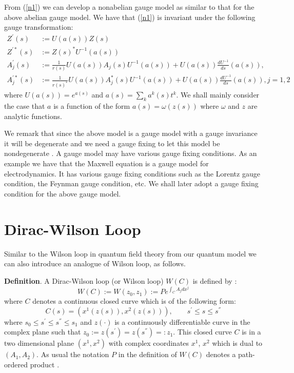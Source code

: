 \documentclass[a4paper,a4paper]{article}
\begin{document}
From (\ref{n1}) we can develop a nonabelian gauge model as similar
to that for the above abelian gauge model.
We have that (\ref{n1}) is invariant under the following
gauge transformation:
\begin{equation}
\begin{array}{rl}
Z^{\prime}(s) & :=U(a(s))Z(s) \\
Z^{\prime *}(s) & :=Z(s)^{*}U^{-1}(a(s)) \\
A_j^{\prime}(s) &
:=
\frac{1}{r(s)}U(a(s))A_j(s)U^{-1}(a(s))+
 U(a(s))\frac{dU^{-1}}{ds}(a(s)),\\
A_j^{\prime *}(s) &
:=
\frac{1}{r(s)^{*}}U(a(s))A_j^{*}(s)U^{-1}(a(s))+
 U(a(s))\frac{dU^{-1}}{ds}(a(s)),
j =1,2
\end{array}
\label{n2}
\end{equation}
where $U(a(s))=e^{a(s)}$ and $a(s)=\sum_k a^k (s)t^k$.
We shall mainly consider the case that $a$ is a function
of the form $a(s)=\omega(z(s))$ where $\omega$ 
and $z$ are analytic functions.

We remark that since the above model is a gauge model with
a gauge invariance it will be degenerate and we need a  gauge fixing to let this model be nondegenerate \cite{Fad}. A gauge model may have various gauge fixing conditions. As an example we have that the  Maxwell equation is a
gauge model for electrodynamics. It has various gauge fixing conditions such as the Lorentz gauge condition, the Feynman gauge condition, etc.
We shall later adopt a gauge fixing condition for the above gauge model.

\section{Dirac-Wilson Loop } \label{sec4}

Similar to the Wilson loop in quantum field theory from our quantum model we can also introduce an analogue of Wilson loop, as follows.

{\bf Definition}.
 A Dirac-Wilson loop (or Wilson loop) $W(C)$ is defined by :
\begin{equation}
W(C):= W(z_0, z_1):= Pe^{\int_C A_jdx^j}
\label{n4}
\end{equation}
where $C$ denotes a continuous closed curve 
which is of the following form:
\begin{equation}
C(s) =(x^1(z(s)), x^2(z(s))), \qquad s^{'}\leq s \leq s^{''}
\label{n4a}
\end{equation}
where $s_0\leq s^{'} \leq s^{''} \leq s_1$ and
$z(\cdot)$ is a continuously differentiable curve in the complex plane such that 
$z_0 :=z(s^{'})=z(s^{''}) =: z_1$. This closed curve
$C$ is
in a two dimensional plane $(x^1, x^2)$ with complex coordinates $x^1$, $x^2$ which is 
dual to $(A_1, A_2)$.
As usual the notation
$P$ in the definition of $W(C)$ denotes a path-ordered product \cite{Wit}\cite{Kau}\cite{Baez}.
\end{document}
